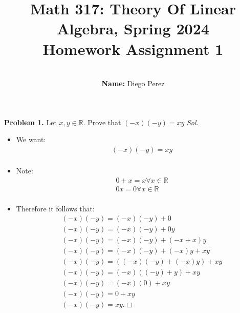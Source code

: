\documentclass[11pt]{article}
\begin{document}
	\title{Math 317: Theory Of Linear Algebra, Spring 2024\\ Homework Assignment
	1}
	\author{\\ \textbf{Name:}
	Diego Perez}
	\date{}
	\maketitle


  {\bf Problem 1.} Let $x, y \in \mathbb{R}$. Prove that $(-x)(-y) = xy$
  \textit{ Sol. }
  \begin{itemize}
    \item[] We want: \begin{align*}
    & (-x)(-y) = xy \\
    \end{align*}
  \item[] Note: \begin{align*}
    & 0 + x = x \forall x \in \mathbb{R} \\
    & 0x  = 0 \forall x \in \mathbb{R} \\
  \end{align*}
\item[] Therefore it follows that: \begin{align*}
    & (-x)(-y) = (-x)(-y) + 0 \\
    & (-x)(-y) = (-x)(-y) + 0y \\
    & (-x)(-y) = (-x)(-y) + (-x + x)y \\
    & (-x)(-y) = (-x)(-y) + (-x)y + xy \\
    & (-x)(-y) = ((-x)(-y) + (-x)y) + xy \\ 
    & (-x)(-y) = (-x)((-y) + y) + xy\\
    & (-x)(-y) = (-x)(0) + xy\\
    & (-x)(-y) = 0 + xy \\
    & (-x)(-y) = xy. \Box \\
  \end{align*}     
  \end{itemize}
	
\end{document}
